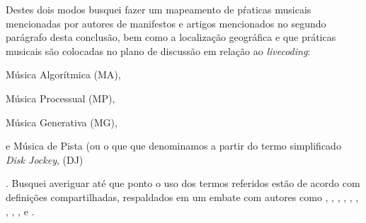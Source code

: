 
Destes dois modos busquei fazer um mapeamento de pŕaticas musicais mencionadas por autores de manifestos e artigos mencionados no segundo parágrafo desta conclusão, bem como a localização geográfica e que práticas musicais são colocadas no plano de discussão em relação ao \emph{livecoding}: \begin{inparaenum}
\item Música Algorítmica (MA),
\item Música Processual (MP), 
\item Música Generativa (MG),
\item e Música de Pista (ou o que que denominamos a partir do termo simplificado \emph{Disk Jockey}, (DJ)
\end{inparaenum}. Busquei averiguar até que ponto o uso dos termos referidos estão de acordo com definições compartilhadas, respaldados em um embate com autores como , , , ,  , , ,  , ,  e  . 

